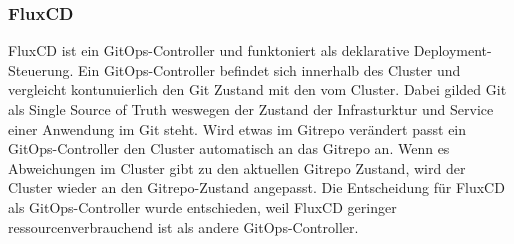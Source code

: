 \subsubsection{FluxCD}
FluxCD ist ein GitOps-Controller und funktoniert als deklarative Deployment-Steuerung.
Ein GitOps-Controller befindet sich innerhalb des Cluster und vergleicht kontunuierlich den Git Zustand mit den vom Cluster.
Dabei gilded Git als Single Source of Truth weswegen der Zustand der Infrasturktur und Service einer Anwendung im Git steht.
Wird etwas im Gitrepo verändert passt ein GitOps-Controller den Cluster automatisch an das Gitrepo an.
Wenn es Abweichungen im Cluster gibt zu den aktuellen Gitrepo Zustand, wird der Cluster wieder an den Gitrepo-Zustand angepasst.
Die Entscheidung für FluxCD als GitOps-Controller wurde entschieden, weil FluxCD geringer ressourcenverbrauchend ist als andere GitOps-Controller.
